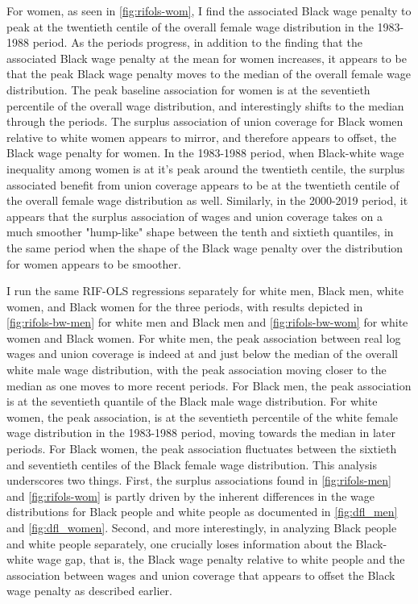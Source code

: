 \documentclass[11pt]{article}
\begin{document}
For women, as seen in \autoref{fig:rifols-wom}, I find the associated Black wage penalty to peak at the twentieth centile of the overall female wage distribution in the 1983-1988 period. As the periods progress, in addition to the finding that the associated Black wage penalty at the mean for women increases, it appears to be that the peak Black wage penalty moves to the median of the overall female wage distribution. The peak baseline association for women is at the seventieth percentile of the overall wage distribution, and interestingly shifts to the median through the periods. The surplus association of union coverage for Black women relative to white women appears to mirror, and therefore appears to offset, the Black wage penalty for women. In the 1983-1988 period, when Black-white wage inequality among women is at it's peak around the twentieth centile, the surplus associated benefit from union coverage appears to be at the twentieth centile of the overall female wage distribution as well. Similarly, in the 2000-2019 period, it appears that the surplus association of wages and union coverage takes on a much smoother "hump-like" shape between the tenth and sixtieth quantiles, in the same period when the shape of the Black wage penalty over the distribution for women appears to be smoother. 

I run the same RIF-OLS regressions separately for white men, Black men, white women, and Black women for the three periods, with results depicted in \autoref{fig:rifols-bw-men} for white men and Black men and \autoref{fig:rifols-bw-wom} for white women and Black women. For white men, the peak association between real log wages and union coverage is indeed at and just below the median of the overall white male wage distribution, with the peak association moving closer to the median as one moves to more recent periods. For Black men, the peak association is at the seventieth quantile of the Black male wage distribution. For white women, the peak association, is at the seventieth percentile of the white female wage distribution in the 1983-1988 period, moving towards the median in later periods. For Black women, the peak association fluctuates between the sixtieth and seventieth centiles of the Black female wage distribution. This analysis underscores two things. First, the surplus associations found in \autoref{fig:rifols-men} and \autoref{fig:rifols-wom} is partly driven by the inherent differences in the wage distributions for Black people and white people as documented in \autoref{fig:dfl_men} and \autoref{fig:dfl_women}. Second, and more interestingly, in analyzing Black people and white people separately, one crucially loses information about the Black-white wage gap, that is, the Black wage penalty relative to white people and the association between wages and union coverage that appears to offset the Black wage penalty as described earlier. 
\end{document}

